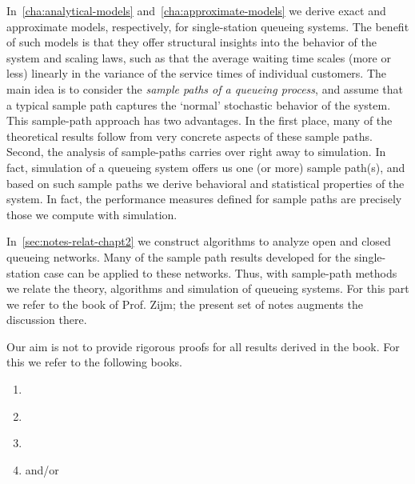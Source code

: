 In~\cref{cha:analytical-models} and~\cref{cha:approximate-models} we derive exact and approximate models, respectively, for single-station queueing systems.
The benefit of such models is that they offer structural insights into the behavior of the system and scaling laws, such as that the average waiting time scales (more or less) linearly in the variance of the service times of individual customers.
The main idea is to consider the \emph{sample paths of a queueing process}, and assume that a typical sample path captures the `normal' stochastic behavior of the system.
This sample-path approach has two advantages.
In the first place, many of the theoretical results follow from very concrete aspects of these sample paths.
Second, the analysis of sample-paths carries over right away to simulation.
In fact, simulation of a queueing system offers us one (or more) sample path(s), and based on such sample paths we derive behavioral and statistical properties of the system.
In fact, the performance measures defined for sample paths are precisely those we compute with simulation.


In~\cref{sec:notes-relat-chapt2}  we construct algorithms to analyze open and closed queueing networks.
Many of the sample path results developed for the single-station case can be applied to these networks.
Thus, with sample-path methods we relate the theory, algorithms and simulation of queueing systems.
For this part we refer to the book of Prof.
Zijm; the present set of notes augments the discussion there.



Our aim is not to provide rigorous proofs for all results derived in the book. For this we refer to the following books. 
\begin{enumerate}
\item \citet{bolch06:_queuein_networ_markov_chain}
\item \citet{capinski03:_probab_probl}
\item \citet{el-taha98:_sampl_path_analy_queuein_system}
\item \citet{tijms94:_stoch_model_algor_approac} and/or \citet{tijms03:_first_cours_stoch_model}
\end{enumerate}

